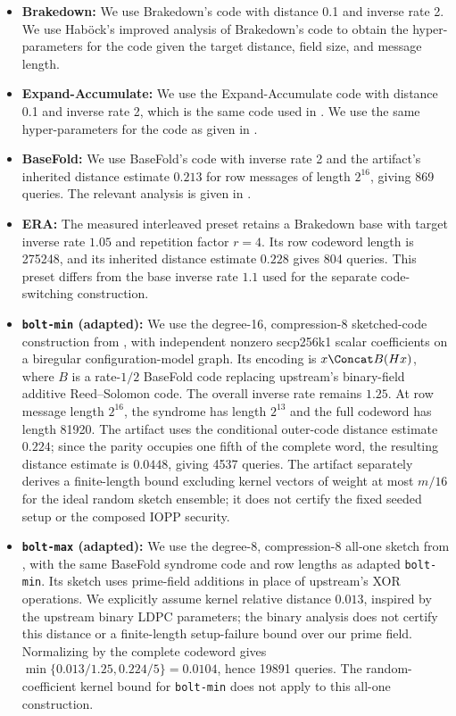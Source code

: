 \begin{itemize}[nolistsep]
    \item \textbf{Brakedown:} We use Brakedown's code with distance 0.1 and inverse rate 2.
    We use Haböck's \cite{Habock23} improved analysis of Brakedown's code to obtain the hyper-parameters for the code given the target distance, field size, and message length.
    \item \textbf{Expand-Accumulate:} We use the Expand-Accumulate code with distance 0.1 and inverse rate 2, which is the same code used in \cite{BlockFKTWZ24}.
    We use the same hyper-parameters for the code as given in \cite{BlockFKTWZ24}.
    \item \textbf{BaseFold:} We use BaseFold's code with inverse rate 2 and the artifact's inherited distance estimate $0.213$ for row messages of length $2^{16}$, giving 869 queries.
    The relevant analysis is given in \cite{ZeilbergerCF24}.
    \item \textbf{ERA:} The measured interleaved preset retains a Brakedown base with target inverse rate $1.05$ and repetition factor $r=4$.
    Its row codeword length is 275248, and its inherited distance estimate $0.228$ gives 804 queries.
    This preset differs from the base inverse rate $1.1$ used for the separate code-switching construction.
    \item \textbf{\texttt{bolt-min} (adapted):} We use the degree-16, compression-8 sketched-code construction from \cite{GurkanNR26}, with independent nonzero secp256k1 scalar coefficients on a biregular configuration-model graph.
    Its encoding is $x\Concat B(Hx)$, where $B$ is a rate-$1/2$ BaseFold code replacing upstream's binary-field additive Reed--Solomon code.
    The overall inverse rate remains $1.25$.
    At row message length $2^{16}$, the syndrome has length $2^{13}$ and the full codeword has length 81920.
    The artifact uses the conditional outer-code distance estimate $0.224$; since the parity occupies one fifth of the complete word, the resulting distance estimate is $0.0448$, giving 4537 queries.
    The artifact separately derives a finite-length bound excluding kernel vectors of weight at most $m/16$ for the ideal random sketch ensemble; it does not certify the fixed seeded setup or the composed IOPP security.
    \item \textbf{\texttt{bolt-max} (adapted):} We use the degree-8, compression-8 all-one sketch from \cite{GurkanNR26}, with the same BaseFold syndrome code and row lengths as adapted \texttt{bolt-min}.
    Its sketch uses prime-field additions in place of upstream's XOR operations.
    We explicitly assume kernel relative distance $0.013$, inspired by the upstream binary LDPC parameters; the binary analysis does not certify this distance or a finite-length setup-failure bound over our prime field.
    Normalizing by the complete codeword gives $\min\{0.013/1.25,0.224/5\}=0.0104$, hence 19891 queries.
    The random-coefficient kernel bound for \texttt{bolt-min} does not apply to this all-one construction.
\end{itemize}

